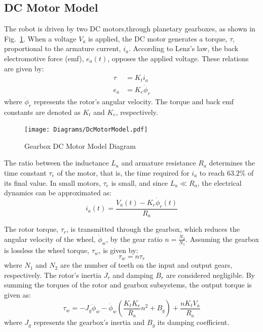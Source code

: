     \subsection{DC Motor Model}    
    The robot is driven by two DC motors,through planetary gearboxes, as shown in Fig.~\ref{fig:DCMotor}.
    When a voltage $V_a$ is applied, the DC motor generates a torque, $\tau$, 
    proportional to the armature current, $i_a$.
    According to Lenz's law, the back electromotive force (emf), $e_a(t)$, 
    opposes the applied voltage. These relations are given by:
    \begin{subequations}
        \begin{align}
            \tau &= K_t i_a \\
            e_a &= K_e \dot{\phi}_r
        \end{align}
    \end{subequations}
    where $\dot{\phi}_r$ represents the rotor's angular velocity. The torque 
    and back emf constants are denoted as $K_t$ and $K_e$, respectively.
    \begin{figure}[H]
        \centering
            \texttt{[image: Diagrams/DcMotorModel.pdf]}
        \caption{Gearbox DC Motor Model Diagram}
        \label{fig:DCMotor}
    \end{figure}
    The ratio between the inductance $L_a$ and armature resistance $R_a$ 
    determines the time constant $\tau_e$ of the motor, that is, the time required 
    for $i_a$ to reach 63.2\% of its final value. In small motors, $\tau_e$ is 
    small, and since $L_a \ll R_a$, the electrical dynamics can be approximated as:
    \begin{equation}
        i_a (t) = \frac{V_a (t) - K_e \dot{\phi}_r (t)}{R_a}
    \end{equation}

    The rotor torque, $\tau_r$, is transmitted through the gearbox, which 
    reduces the angular velocity of the wheel, $\dot{\phi}_w$, by the gear ratio $n = \frac{N_2}{N_1}$. 
    Assuming the gearbox is lossless the wheel torque, $\tau_w$, is given by:
    \begin{equation}
            \tau_w = n\tau_r
    \end{equation}
    where $N_1$ and $N_2$ are the number of teeth on the input and output gears, respectively.
    The rotor's inertia $J_r$ and damping $B_r$ are considered negligible.
    By summing the torques of the rotor and gearbox subsystems, the output torque is given as:
    \begin{equation}
        \tau_w = - J_g \ddot{\phi}_w - \dot{\phi}_w \left( \frac{K_t K_e}{R_a} n^2 + B_g \right) + \frac{n K_t V_a}{R_a}
    \end{equation}
    where $J_g$ represents the gearbox's inertia and $B_g$ its damping coefficient.

